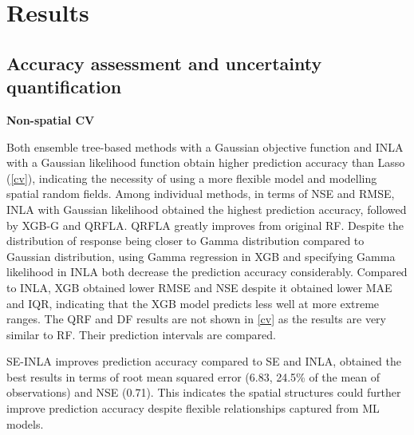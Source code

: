 \documentclass{article}
\begin{document}



\section{Results}
\subsection{Accuracy assessment and uncertainty quantification}



\textbf{Non-spatial CV}

Both ensemble tree-based methods with a Gaussian objective function and INLA with a Gaussian likelihood function obtain higher prediction accuracy than Lasso (\cref{cv}), indicating the necessity of using a more flexible model and modelling spatial random fields. Among individual methods, in terms of NSE and RMSE, INLA with Gaussian likelihood obtained the highest prediction accuracy, followed by XGB-G and QRFLA. QRFLA greatly improves from original RF. Despite the distribution of response being closer to Gamma distribution compared to Gaussian distribution, using Gamma regression in XGB and specifying Gamma likelihood in INLA both decrease the prediction accuracy considerably. Compared to INLA, XGB obtained lower RMSE and NSE despite it obtained lower MAE and IQR, indicating that the XGB model predicts less well at more extreme ranges. The QRF and DF results are not shown in \cref{cv} as the results are very similar to RF. Their prediction intervals are compared. 

 
SE-INLA improves prediction accuracy compared to SE and INLA, obtained the best results in terms of root mean squared error (6.83, 24.5\% of the mean of observations) and NSE (0.71). This indicates the spatial structures could further improve prediction accuracy despite flexible relationships captured from ML models.
 
\end{document}
